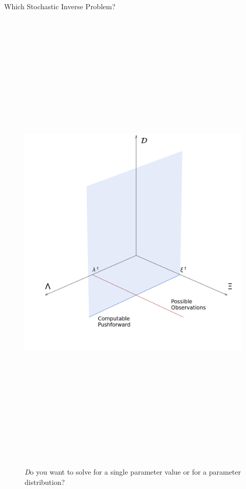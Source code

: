 \begin{block}{Which Stochastic Inverse Problem?}
\centering

    \begin{figure}
        \includegraphics[height=23cm]{figures/diagram}
    \caption{\large \emph Do you want to solve for a single parameter value or for a parameter distribution?}
    \end{figure}



\end{block}
